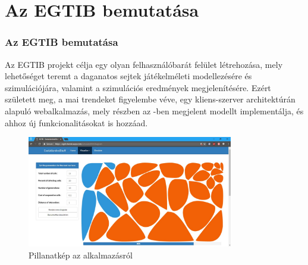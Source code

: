 \section{Az EGTIB bemutatása}
\begin{frame}
\frametitle{Az EGTIB bemutatása}
Az EGTIB projekt célja egy olyan felhasználóbarát felület létrehozása, mely lehetőséget teremt a daganatos sejtek játékelméleti modellezésére és szimulációjára, valamint a szimulációs eredmények megjelenítésére. Ezért született meg, a mai trendeket figyelembe véve, egy kliens-szerver architektúrán alapuló webalkalmazás, mely részben az \cite{archetti2016cooperation}-ben megjelent modellt implementálja, és ahhoz új funkcionalitásokat is hozzáad.

\begin{figure}[ht!]
	\centering
	\includegraphics[width=90mm]{images/EGTIB.jpg}
	\caption{Pillanatkép az alkalmazásról \label{fig:SimulateWithDiagram}}
\end{figure}
\end{frame}

